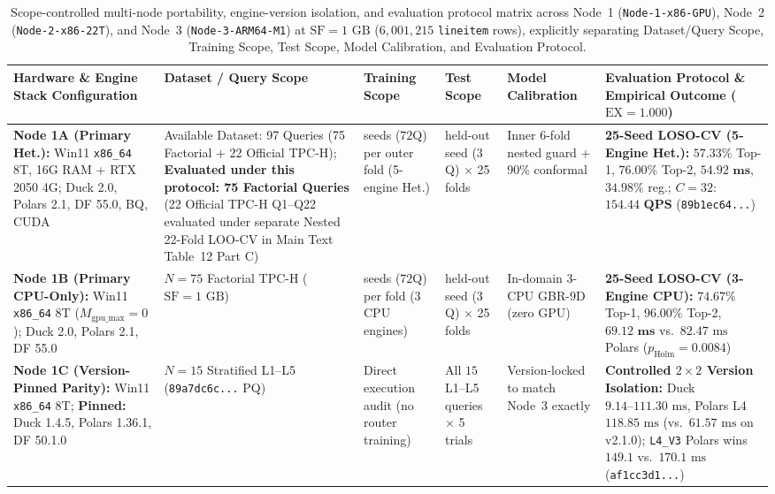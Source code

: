 \documentclass[10pt,a4paper]{article}
\newenvironment{fitasttable}{%
  \begin{lrbox}{\asttblbox}%
}{%
  \end{lrbox}%
  \sbox{\asttblboxB}{%
    \ifdim\wd\asttblbox>0.96\textwidth
      \resizebox{0.96\textwidth}{!}{\usebox{\asttblbox}}%
    \else
      \usebox{\asttblbox}%
    \fi
  }%
  \ifdim\ht\asttblboxB>0.78\textheight
    \resizebox{!}{0.78\textheight}{\usebox{\asttblboxB}}%
  \else
    \usebox{\asttblboxB}%
  \fi
}
\begin{document}
\begin{table}[!htbp]
\centering
\caption{Scope-controlled multi-node portability, engine-version isolation, and evaluation protocol matrix across Node~1 (\texttt{Node-1-x86-GPU}), Node~2 (\texttt{Node-2-x86-22T}), and Node~3 (\texttt{Node-3-ARM64-M1}) at $\text{SF}=1\text{ GB}$ ($6{,}001{,}215$ \texttt{lineitem} rows), explicitly separating Dataset/Query Scope, Training Scope, Test Scope, Model Calibration, and Evaluation Protocol.}\label{tab:three_node_cross_isa}\label{tab:jbd_multinode_t15}
\setlength{\tabcolsep}{2.8pt}
\renewcommand{\arraystretch}{1.12}
\scriptsize
\begin{fitasttable}
\begin{tabular}{@{}>{\raggedright\arraybackslash}p{2.9cm}>{\raggedright\arraybackslash}p{2.5cm}>{\raggedright\arraybackslash}p{2.2cm}>{\raggedright\arraybackslash}p{2.1cm}>{\raggedright\arraybackslash}p{2.3cm}>{\raggedright\arraybackslash}p{4.6cm}@{}}
\toprule
\textbf{Hardware \& Engine Stack Configuration} & \textbf{Dataset / Query Scope} & \textbf{Training Scope} & \textbf{Test Scope} & \textbf{Model Calibration} & \textbf{Evaluation Protocol \& Empirical Outcome ($\text{EX}=1.000$)} \\
\midrule
\textbf{Node 1A (Primary Het.):} Win11 \texttt{x86\_\allowbreak{}64} 8T, 16G RAM + RTX 2050 4G; Duck 2.0, Polars 2.1, DF 55.0, BQ, CUDA & Available Dataset: 97 Queries (75 Factorial + 22 Official TPC-H); \textbf{Evaluated under this protocol: 75 Factorial Queries} (22 Official TPC-H Q1--Q22 evaluated under separate Nested 22-Fold LOO-CV in Main Text Table~12 Part C) & 24 seeds ($72$Q) per outer fold (5-engine Het.) & 1 held-out seed ($3$Q) $\times$ 25 folds & Inner 6-fold nested guard + 90\% conformal & \textbf{25-Seed LOSO-CV (5-Engine Het.):} $57.33\%$ Top-1, $76.00\%$ Top-2, $\mathbf{54.92\text{ ms}}$, $34.98\%$ reg.; $C=32$: $\mathbf{154.44\text{ QPS}}$ (\texttt{89b1ec64...}) \\
\textbf{Node 1B (Primary CPU-Only):} Win11 \texttt{x86\_\allowbreak{}64} 8T ($M_{\text{gpu\_max}}=0$); Duck 2.0, Polars 2.1, DF 55.0 & $N=75$ Factorial TPC-H ($\text{SF}=1\text{ GB}$) & 24 seeds ($72$Q) per fold (3 CPU engines) & 1 held-out seed ($3$Q) $\times$ 25 folds & In-domain 3-CPU GBR-9D (zero GPU) & \textbf{25-Seed LOSO-CV (3-Engine CPU):} $\mathbf{74.67\%}$ Top-1, $96.00\%$ Top-2, $\mathbf{69.12\text{ ms}}$ vs.\ $82.47\text{ ms}$ Polars ($p_{\text{Holm}}=0.0084$) \\
\textbf{Node 1C (Version-Pinned Parity):} Win11 \texttt{x86\_\allowbreak{}64} 8T; \textbf{Pinned:} Duck 1.4.5, Polars 1.36.1, DF 50.1.0 & $N=15$ Stratified L1--L5 (\texttt{89a7dc6c...} PQ) & Direct execution audit (no router training) & All $15$ L1--L5 queries $\times$ 5 trials & Version-locked to match Node~3 exactly & \textbf{Controlled $2\times 2$ Version Isolation:} Duck $9.14\text{--}111.30\text{ ms}$, Polars L4 $118.85\text{ ms}$ (vs.\ $61.57\text{ ms}$ on v2.1.0); \texttt{L4\_\allowbreak{}V3} Polars wins $149.1$ vs.\ $170.1\text{ ms}$ (\texttt{af1cc3d1...}) \\

\end{tabular}
\end{fitasttable}
\end{table}
\end{document}
